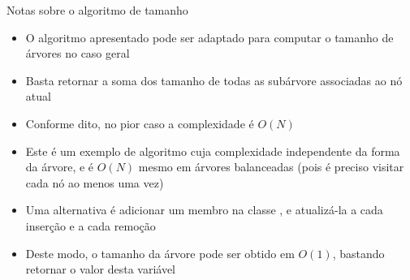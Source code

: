 \begin{frame}[fragile]{Notas sobre o algoritmo de tamanho}

	\begin{itemize}
		\item O algoritmo apresentado pode ser {adaptado} para computar 
		o tamanho de árvores no {caso geral}

		\item Basta retornar a soma dos tamanho de 
		{todas} as subárvore associadas ao nó atual

		\item Conforme dito, no pior caso a complexidade é $O(N)$

		\item Este é um exemplo de algoritmo cuja complexidade independente da forma da árvore,
            e é $O(N)$ mesmo em árvores balanceadas (pois é preciso visitar cada nó ao menos
            uma vez)

        \item Uma alternativa é adicionar um membro  na classe ,
            e atualizá-la a cada inserção e a cada remoção

        \item Deste modo, o tamanho da árvore pode ser obtido em $O(1)$, bastando retornar o valor
            desta variável
	\end{itemize}

\end{frame}

